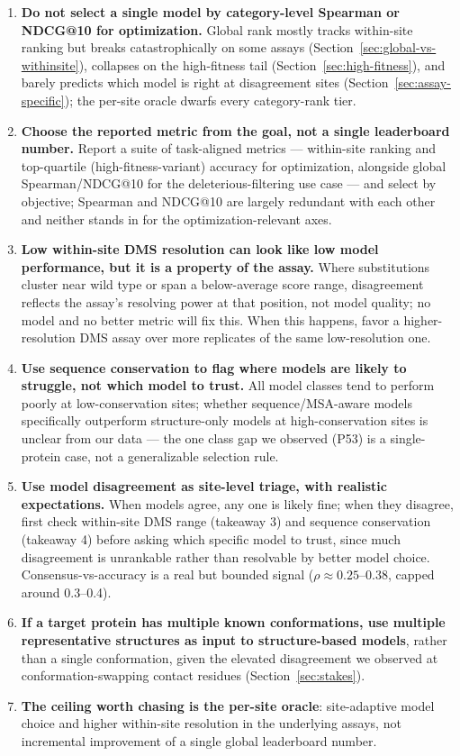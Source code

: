 \documentclass{article}
\begin{document}
\begin{enumerate}
  \item \textbf{Do not select a single model by category-level Spearman or NDCG@10 for optimization.} Global rank mostly tracks within-site ranking but breaks catastrophically on some assays (Section~\ref{sec:global-vs-withinsite}), collapses on the high-fitness tail (Section~\ref{sec:high-fitness}), and barely predicts which model is right at disagreement sites (Section~\ref{sec:assay-specific}); the per-site oracle dwarfs every category-rank tier.
  \item \textbf{Choose the reported metric from the goal, not a single leaderboard number.} Report a suite of task-aligned metrics --- within-site ranking and top-quartile (high-fitness-variant) accuracy for optimization, alongside global Spearman/NDCG@10 for the deleterious-filtering use case --- and select by objective; Spearman and NDCG@10 are largely redundant with each other and neither stands in for the optimization-relevant axes.
  \item \textbf{Low within-site DMS resolution can look like low model performance, but it is a property of the assay.} Where substitutions cluster near wild type or span a below-average score range, disagreement reflects the assay's resolving power at that position, not model quality; no model and no better metric will fix this. When this happens, favor a higher-resolution DMS assay over more replicates of the same low-resolution one.
  \item \textbf{Use sequence conservation to flag where models are likely to struggle, not which model to trust.} All model classes tend to perform poorly at low-conservation sites; whether sequence/MSA-aware models specifically outperform structure-only models at high-conservation sites is unclear from our data --- the one class gap we observed (P53) is a single-protein case, not a generalizable selection rule.
  \item \textbf{Use model disagreement as site-level triage, with realistic expectations.} When models agree, any one is likely fine; when they disagree, first check within-site DMS range (takeaway 3) and sequence conservation (takeaway 4) before asking which specific model to trust, since much disagreement is unrankable rather than resolvable by better model choice. Consensus-vs-accuracy is a real but bounded signal ($\rho\approx0.25$--0.38, capped around 0.3--0.4).
  \item \textbf{If a target protein has multiple known conformations, use multiple representative structures as input to structure-based models}, rather than a single conformation, given the elevated disagreement we observed at conformation-swapping contact residues (Section~\ref{sec:stakes}).
  \item \textbf{The ceiling worth chasing is the per-site oracle}: site-adaptive model choice and higher within-site resolution in the underlying assays, not incremental improvement of a single global leaderboard number.
\end{enumerate}
\end{document}
